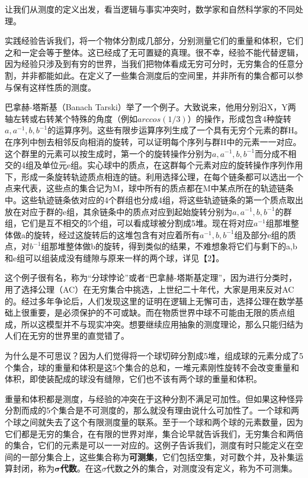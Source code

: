 让我们从测度的定义出发，看当逻辑与事实冲突时，数学家和自然科学家的不同处理。

实践经验告诉我们，将一个物体分割成几部分，分别测量它们的重量和体积，它们之和一定会等于整体。这已经成了无可置疑的真理。很不幸，经验不能代替逻辑，因为经验只涉及到有穷的世界，当我们把物体看成无穷可分时，无穷集合的任意分割，并非都能如此。在定义了一些集合测度后的空间里，并非所有的集合都可以参与保有这样性质的测度。

\kaishu\setlength{\leftskip}{1em}

巴拿赫-塔斯基（Banach Tarski）举了一个例子。大致说来，他用分别沿X，Y两轴左转或右转某个特殊的角度（例如$ arccos(1/3) $）的操作，形成包含4种旋转$ a,a^{-1},b,b^{-1} $的运算序列。这些有限步运算序列生成了一个具有无穷个元素的群H。在序列中刨去相邻反向相消的旋转，可以证明每个序列与群H中的元素一一对应。这个群里的元素可以按生成时，第一个的旋转操作分别为$ a,a^{-1},b,b^{-1} $而分成不相交的4组及单位元e组。实心球中的质点，在这群每个元素对应的旋转操作序列作用下，形成一条旋转轨迹质点相连的链。利用选择公理，在每个链条都可以选出一个点来代表，这些点的集合记为M，球中所有的质点都在M中某点所在的轨迹链条中。这些轨迹链条依对应的4个群组也分成4组，将这些轨迹链条的第一个质点取出放在对应于群的e组，其余链条中的质点对应到起始旋转分别为$ a,a^{-1},b,b^{-1} $的群组，它们是互不相交的5个组，可以看成球被分割成5堆。现在将对应$ a^{-1} $组那堆整体做a的旋转，经过这旋转后的这堆包含有对应着所有$ a^{-1},b,b^{-1} $组及部分e组的质点，对$ b^{-1} $组那堆整体做b的旋转，得到类似的结果，不难想象将它们与剩下的a,b和e组可以组装成没有缝隙与原来一样的两个球，详见【2】。

这个例子很有名，称为``分球悖论''或者``巴拿赫-塔斯基定理''，因为进行分类时，用了选择公理（AC）在无穷集合中挑选，上世纪二十年代，大家是用来反对AC的。经过多年争论后，人们发现这里的证明在逻辑上无懈可击，选择公理在数学基础上很重要，是必须保护的不可或缺。而在物质世界中球不可能由无限的质点组成，所以这模型并不与现实冲突。想要继续应用抽象的测度理论，那么只能归结为人们在无穷的世界里的直觉错了。

\songti\setlength{\leftskip}{0em}

为什么是不可思议？因为人们觉得将一个球切碎分割成5堆，组成球的元素分成了5个集合，球的重量和体积是这5个集合的总和，一堆元素刚性旋转不会改变重量和体积，即使装配成的球没有缝隙，它们也不该有两个球的重量和体积。

重量和体积都是测度，与经验的冲突在于这种分割不满足可加性。但如果这种怪异分割而成的5个集合是不可测度的，那么就没有理由说什么可加性了。一个球和两个球之间就失去了这个有限测度量的联系。至于一个球和两个球的元素数量，因为它们都是无穷的集合，在有限的世界对岸，集合论早就告诉我们，无穷集合和两倍的集合，它们的元素是可以一一对应的。这例子告诉我们，测度有时只能定义在空间的一部分集合上，这些集合称为\textbf{可测集}，它们包括空集，对可数个并，及补集运算封闭，称为$ \mathbf{\sigma} $\textbf{代数}。在这$ \sigma $代数之外的集合，对测度没有定义，称为不可测集。

